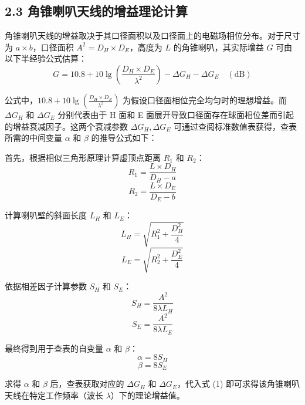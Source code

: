 \documentclass{ctexart}
\begin{document}
\subsection*{2.3 角锥喇叭天线的增益理论计算}
角锥喇叭天线的增益取决于其口径面积以及口径面上的电磁场相位分布。对于尺寸为 $a \times b$，口径面积 $A^2 = D_H \times D_E$，高度为 $L$ 的角锥喇叭，其实际增益 $G$ 可由以下半经验公式估算：
\begin{equation}
    G = 10.8 + 10\lg\left(\frac{D_H \times D_E}{\lambda^2}\right) - \Delta G_H - \Delta G_E \quad (\text{dB})
\end{equation}

公式中，$10.8 + 10\lg(\frac{D_H \times D_E}{\lambda^2})$ 为假设口径面相位完全均匀时的理想增益。而 $\Delta G_H$ 和 $\Delta G_E$ 分别代表由于 H 面和 E 面展开导致口径面存在球面相位差而引起的增益衰减因子。这两个衰减参数 $\Delta G_H, \Delta G_E$ 可通过查阅标准数值表获得，查表所需的中间变量 $\alpha$ 和 $\beta$ 的推导公式如下：

首先，根据相似三角形原理计算虚顶点距离 $R_1$ 和 $R_2$：
\begin{equation}
    R_1 = \frac{L \times D_H}{D_H - a}
\end{equation}
\begin{equation}
    R_2 = \frac{L \times D_E}{D_E - b}
\end{equation}

计算喇叭壁的斜面长度 $L_H$ 和 $L_E$：
\begin{equation}
    L_H = \sqrt{R_1^2 + \frac{D_H^2}{4}}
\end{equation}
\begin{equation}
    L_E = \sqrt{R_2^2 + \frac{D_E^2}{4}}
\end{equation}

依据相差因子计算参数 $S_H$ 和 $S_E$：
\begin{equation}
    S_H = \frac{A^2}{8\lambda L_H}
\end{equation}
\begin{equation}
    S_E = \frac{A^2}{8\lambda L_E}
\end{equation}

最终得到用于查表的自变量 $\alpha$ 和 $\beta$：
\begin{equation}
    \alpha = 8S_H
\end{equation}
\begin{equation}
    \beta = 8S_E
\end{equation}

求得 $\alpha$ 和 $\beta$ 后，查表获取对应的 $\Delta G_H$ 和 $\Delta G_E$，代入式 (1) 即可求得该角锥喇叭天线在特定工作频率（波长 $\lambda$）下的理论增益值。
\end{document}
